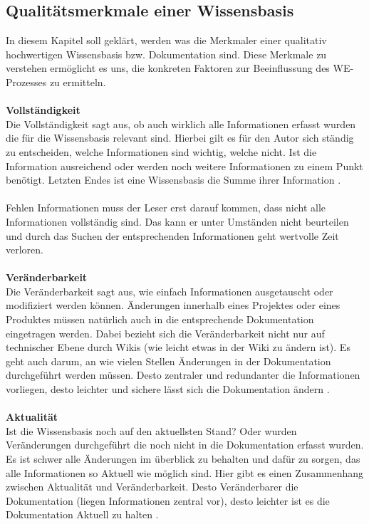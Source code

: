 \documentclass[a4paper,12pt]{scrartcl}
\begin{document}
\subsection{Qualitätsmerkmale einer Wissensbasis}
In diesem Kapitel soll geklärt, werden was die Merkmaler einer qualitativ hochwertigen Wissensbasis bzw. Dokumentation sind. Diese Merkmale zu verstehen ermöglicht es uns, die konkreten Faktoren zur Beeinflussung des WE-Prozesses zu ermitteln.
\\\\
\textbf{Vollständigkeit}\\
Die Vollständigkeit sagt aus, ob auch wirklich alle Informationen erfasst wurden die für die Wissensbasis relevant sind. Hierbei gilt es für den Autor sich ständig zu entscheiden, welche Informationen sind wichtig, welche nicht. Ist die Information ausreichend oder werden noch weitere Informationen zu einem Punkt benötigt. Letzten Endes ist eine Wissensbasis die Summe ihrer Information \cite{Prause2013}.
\\\\
Fehlen Informationen muss der Leser erst darauf kommen, dass nicht alle Informationen vollständig sind. Das kann er unter Umständen nicht beurteilen und durch das Suchen der entsprechenden Informationen geht wertvolle Zeit verloren.
\\\\
\textbf{Veränderbarkeit}\\
Die Veränderbarkeit sagt aus, wie einfach Informationen ausgetauscht oder modifiziert werden können. Änderungen innerhalb eines Projektes oder eines Produktes müssen natürlich auch in die entsprechende Dokumentation eingetragen werden. Dabei bezieht sich die Veränderbarkeit nicht nur auf technischer Ebene durch Wikis (wie leicht etwas in der Wiki zu ändern ist). Es geht auch darum, an wie vielen Stellen Änderungen in der Dokumentation durchgeführt werden müssen. Desto zentraler und redundanter die Informationen vorliegen, desto leichter und sichere lässt sich die Dokumentation ändern \cite{Prause2013}.
\\\\
\textbf{Aktualität}\\
Ist die Wissensbasis noch auf den aktuellsten Stand? Oder wurden Veränderungen durchgeführt die noch nicht in die Dokumentation erfasst wurden. Es ist schwer alle Änderungen im überblick zu behalten und dafür zu sorgen, das alle Informationen so Aktuell wie möglich sind. Hier gibt es einen Zusammenhang zwischen Aktualität und Veränderbarkeit. Desto Veränderbarer die Dokumentation (liegen Informationen zentral vor), desto leichter ist es die Dokumentation Aktuell zu halten \cite{Prause2013}.
\end{document}
